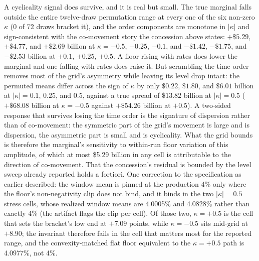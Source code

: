 \documentclass[12pt]{article}
\begin{document}
A cyclicality signal does survive, and it is real but small. The true marginal falls outside the entire twelve-draw permutation range at every one of the six non-zero $\kappa$ (0 of 72 draws bracket it), and the order components are monotone in $|\kappa|$ and sign-consistent with the co-movement story the concession above states: $+\$5.29$, $+\$4.77$, and $+\$2.69$ billion at $\kappa = -0.5$, $-0.25$, $-0.1$, and $-\$1.42$, $-\$1.75$, and $-\$2.53$ billion at $+0.1$, $+0.25$, $+0.5$. A floor rising with rates does lower the marginal and one falling with rates does raise it. But scrambling the time order removes most of the grid's asymmetry while leaving its level drop intact: the permuted means differ across the sign of $\kappa$ by only $\$0.22$, $\$1.80$, and $\$6.01$ billion at $|\kappa| = 0.1$, $0.25$, and $0.5$, against a true spread of $\$13.82$ billion at $|\kappa| = 0.5$ ($+\$68.08$ billion at $\kappa = -0.5$ against $+\$54.26$ billion at $+0.5$). A two-sided response that survives losing the time order is the signature of dispersion rather than of co-movement: the symmetric part of the grid's movement is large and is dispersion, the asymmetric part is small and is cyclicality. What the grid bounds is therefore the marginal's sensitivity to within-run floor variation of this amplitude, of which at most \$5.29 billion in any cell is attributable to the direction of co-movement. That the concession's residual is bounded by the level sweep already reported holds a fortiori. One correction to the specification as earlier described: the window mean is pinned at the production 4\% only where the floor's non-negativity clip does not bind, and it binds in the two $|\kappa| = 0.5$ stress cells, whose realized window means are 4.0005\% and 4.0828\% rather than exactly 4\% (the artifact flags the clip per cell). Of those two, $\kappa = +0.5$ is the cell that sets the bracket's low end at $+7.09$ points, while $\kappa = -0.5$ sits mid-grid at $+8.90$; the invariant therefore fails in the cell that matters most for the reported range, and the convexity-matched flat floor equivalent to the $\kappa = +0.5$ path is 4.0977\%, not 4\%.
\end{document}
